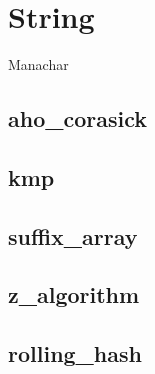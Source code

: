 \section{String}

Manachar


\subsection{aho_corasick}


\subsection{kmp}


\subsection{suffix_array}


\subsection{z_algorithm}


\subsection{rolling_hash}

